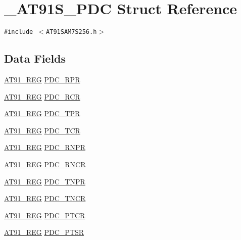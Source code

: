 \hypertarget{struct__AT91S__PDC}{
\section{\_\-AT91S\_\-PDC Struct Reference}
\label{struct__AT91S__PDC}
}
{\tt \#include $<$AT91SAM7S256.h$>$}

\subsection*{Data Fields}
\begin{CompactItemize}
\item 
\hyperlink{AT91SAM7X256_8h_712ad5a1ac1bd02f3e95a7526c283ce1}{AT91\_\-REG} \hyperlink{struct__AT91S__PDC_96c8c767475f69faf5c83cbac1690102}{PDC\_\-RPR}
\item 
\hyperlink{AT91SAM7X256_8h_712ad5a1ac1bd02f3e95a7526c283ce1}{AT91\_\-REG} \hyperlink{struct__AT91S__PDC_d1688f602dd1c369fc1604c51cc05c2f}{PDC\_\-RCR}
\item 
\hyperlink{AT91SAM7X256_8h_712ad5a1ac1bd02f3e95a7526c283ce1}{AT91\_\-REG} \hyperlink{struct__AT91S__PDC_15d473588119af649205c986be0e6639}{PDC\_\-TPR}
\item 
\hyperlink{AT91SAM7X256_8h_712ad5a1ac1bd02f3e95a7526c283ce1}{AT91\_\-REG} \hyperlink{struct__AT91S__PDC_9e2a379cc2a8a64b215de556a0ba8b2e}{PDC\_\-TCR}
\item 
\hyperlink{AT91SAM7X256_8h_712ad5a1ac1bd02f3e95a7526c283ce1}{AT91\_\-REG} \hyperlink{struct__AT91S__PDC_6454ec358a78c11a66179bb97832f2d3}{PDC\_\-RNPR}
\item 
\hyperlink{AT91SAM7X256_8h_712ad5a1ac1bd02f3e95a7526c283ce1}{AT91\_\-REG} \hyperlink{struct__AT91S__PDC_d63bbe1f7711aa4b34853bbbe75d6104}{PDC\_\-RNCR}
\item 
\hyperlink{AT91SAM7X256_8h_712ad5a1ac1bd02f3e95a7526c283ce1}{AT91\_\-REG} \hyperlink{struct__AT91S__PDC_21220f0508a5ec5c7737a82afa89dc35}{PDC\_\-TNPR}
\item 
\hyperlink{AT91SAM7X256_8h_712ad5a1ac1bd02f3e95a7526c283ce1}{AT91\_\-REG} \hyperlink{struct__AT91S__PDC_4b2288712d4b7e04c414ad20d302915d}{PDC\_\-TNCR}
\item 
\hyperlink{AT91SAM7X256_8h_712ad5a1ac1bd02f3e95a7526c283ce1}{AT91\_\-REG} \hyperlink{struct__AT91S__PDC_f54cc3edd8cf870f581ca7f598e2e9ba}{PDC\_\-PTCR}
\item 
\hyperlink{AT91SAM7X256_8h_712ad5a1ac1bd02f3e95a7526c283ce1}{AT91\_\-REG} \hyperlink{struct__AT91S__PDC_534356e87aed2a4f5c6e1c4370f4afcf}{PDC\_\-PTSR}
\end{CompactItemize}


